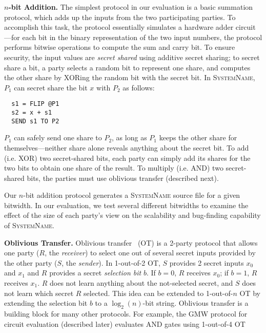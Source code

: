 \documentclass[conference]{IEEEtran}
\renewcommand{\paragraph}[1]{\vspace*{2pt}\noindent\textbf{#1}}
\newcommand{\system}{\textsc{SystemName}\xspace}
\begin{document}
\paragraph{$n$-bit Addition.}
The simplest protocol in our evaluation is a basic summation protocol, which adds up the inputs from the two participating parties. To accomplish this task, the protocol essentially simulates a hardware adder circuit---for each bit in the binary representation of the two input numbers, the protocol performs bitwise operations to compute the sum and carry bit. To ensure security, the input values are \emph{secret shared} using additive secret sharing; to secret share a bit, a party selects a random bit to represent one share, and computes the other share by XORing the random bit with the secret bit. In \system, $P_1$ can secret share the bit $x$ with $P_2$ as follows:
%
\begin{verbatim}
  s1 = FLIP @P1
  s2 = x + s1
  SEND s1 TO P2
\end{verbatim}
%
$P_1$ can safely send one share to $P_2$, as long as $P_1$ keeps the other share for themselves---neither share alone reveals anything about the secret bit. To add (i.e. XOR) two secret-shared bits, each party can simply add its shares for the two bits to obtain one share of the result. To multiply (i.e. AND) two secret-shared bits, the parties must use oblivious transfer (described next).

Our $n$-bit addition protocol generates a \system source file for a given bitwidth. In our evaluation, we test several different bitwidths to examine the effect of the size of each party's view on the scalability and bug-finding capability of \system.

\paragraph{Oblivious Transfer.}
Oblivious transfer~\cite{todo} (OT) is a 2-party protocol that allows one party ($R$, the \emph{receiver}) to select one out of several secret inputs provided by the other party ($S$, the \emph{sender}). In 1-out-of-2 OT, $S$ provides 2 secret inputs $x_0$ and $x_1$ and $R$ provides a secret \emph{selection bit} $b$. If $b=0$, $R$ receives $x_0$; if $b=1$, $R$ receives $x_1$. $R$ does not learn anything about the not-selected secret, and $S$ does not learn which secret $R$ selected. This idea can be extended to 1-out-of-$n$ OT by extending the selection bit $b$ to a $\log_2(n)$-bit string.
%
Oblivious transfer is a building block for many other protocols. For example, the GMW protocol for circuit evaluation (described later) evaluates AND gates using 1-out-of-4 OT
\end{document}
